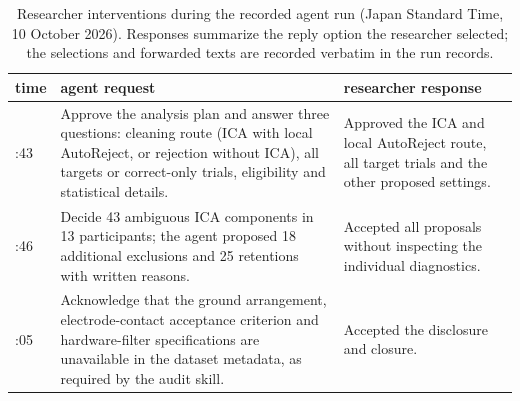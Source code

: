 \begin{table}[!htbp]
\centering\footnotesize
\caption{Researcher interventions during the recorded agent run (Japan Standard Time, 10 October 2026). Responses summarize the reply option the researcher selected; the selections and forwarded texts are recorded verbatim in the run records.}
\label{tab:interventions}
\begin{tabular}{>{\raggedright\arraybackslash}p{1.3cm}>{\raggedright\arraybackslash}p{6.6cm}>{\raggedright\arraybackslash}p{6.3cm}}
\toprule
time & agent request & researcher response \\
\midrule
15:43 & Approve the analysis plan and answer three questions: cleaning route (ICA with local AutoReject, or rejection without ICA), all targets or correct-only trials, eligibility and statistical details. & Approved the ICA and local AutoReject route, all target trials and the other proposed settings. \\
16:46 & Decide 43 ambiguous ICA components in 13 participants; the agent proposed 18 additional exclusions and 25 retentions with written reasons. & Accepted all proposals without inspecting the individual diagnostics. \\
18:05 & Acknowledge that the ground arrangement, electrode-contact acceptance criterion and hardware-filter specifications are unavailable in the dataset metadata, as required by the audit skill. & Accepted the disclosure and closure. \\
\bottomrule
\end{tabular}
\end{table}
